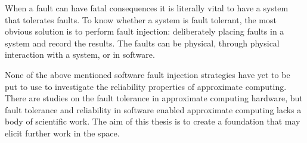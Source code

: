 


When a fault can have fatal consequences it is literally vital to have a system that tolerates faults. To know whether a system is fault tolerant, the most obvious solution is to perform fault injection: deliberately placing faults in a system and record the results. The faults can be physical, through physical interaction with a system, or in software. 



None of the above mentioned software fault injection strategies have yet to be put to use to investigate the reliability properties of approximate computing. There are studies on the fault tolerance in approximate computing hardware, but fault tolerance and reliability in software enabled approximate computing lacks a body of scientific work. The aim of this thesis is to create a foundation that may elicit further work in the space.

